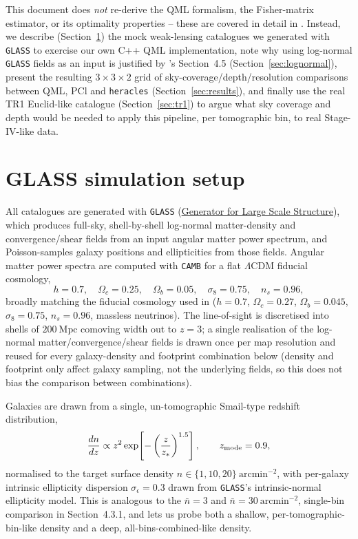\documentclass[11pt]{article}
\begin{document}
This document does \emph{not} re-derive the QML formalism, the Fisher-matrix estimator,
or its optimality properties -- these are covered in detail in \citet{Maraio2022}. Instead,
we describe (Section~\ref{sec:setup}) the mock weak-lensing catalogues we generated with
\texttt{GLASS} to exercise our own C++ QML implementation, note why using log-normal
\texttt{GLASS} fields as an input is justified by \citet{Maraio2022}'s Section~4.5
(Section~\ref{sec:lognormal}), present the resulting $3\times3\times2$ grid of
sky-coverage/depth/resolution comparisons between QML, PCl and \texttt{heracles}
(Section~\ref{sec:results}), and finally use the real TR1 Euclid-like catalogue
(Section~\ref{sec:tr1}) to argue what sky coverage and depth would be needed to apply
this pipeline, per tomographic bin, to real Stage-IV-like data.

\section{GLASS simulation setup}
\label{sec:setup}

All catalogues are generated with \texttt{GLASS}
(\href{https://github.com/glass-dev/glass}{Generator for Large Scale Structure}), which
produces full-sky, shell-by-shell log-normal matter-density and convergence/shear fields
from an input angular matter power spectrum, and Poisson-samples galaxy positions and
ellipticities from those fields. Angular matter power spectra are computed with
\texttt{CAMB} for a flat $\Lambda$CDM fiducial cosmology,
\[
h = 0.7,\quad \Omega_c = 0.25,\quad \Omega_b = 0.05,\quad \sigma_8 = 0.75,\quad n_s = 0.96,
\]
broadly matching the fiducial cosmology used in \citet{Maraio2022}
($h=0.7$, $\Omega_c=0.27$, $\Omega_b=0.045$, $\sigma_8=0.75$, $n_s=0.96$, massless
neutrinos). The line-of-sight is discretised into shells of $200\ \mathrm{Mpc}$ comoving
width out to $z=3$; a single realisation of the log-normal matter/convergence/shear
fields is drawn once per map resolution and reused for every galaxy-density and
footprint combination below (density and footprint only affect galaxy sampling, not the
underlying fields, so this does not bias the comparison between combinations).

Galaxies are drawn from a single, un-tomographic Smail-type redshift distribution,
\[
\frac{dn}{dz} \propto z^{2}\exp\!\left[-\left(\frac{z}{z_\ast}\right)^{1.5}\right],
\qquad z_{\rm mode}=0.9,
\]
normalised to the target surface density $n \in \{1, 10, 20\}\ \mathrm{arcmin}^{-2}$, with
per-galaxy intrinsic ellipticity dispersion $\sigma_\epsilon = 0.3$ drawn from
\texttt{GLASS}'s intrinsic-normal ellipticity model. This is analogous to the
$\bar n = 3$ and $\bar n = 30\ \mathrm{arcmin}^{-2}$, single-bin comparison in
\citet{Maraio2022} Section~4.3.1, and lets us probe both a shallow, per-tomographic-bin-like
density and a deep, all-bins-combined-like density.
\end{document}

